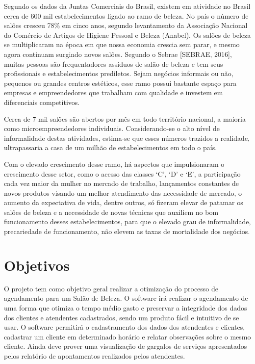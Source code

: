 \documentclass{automatextcc}
\begin{document}
  	Segundo os dados da Juntas Comerciais do Brasil, existem em atividade no Brasil cerca de 600 mil estabelecimentos ligado ao ramo de beleza. No país o número de salões cresceu 78\% em cinco anos, segundo levantamento da Associação Nacional do Comércio de Artigos de Higiene Pessoal e Beleza (Anabel). Os salões de beleza se multiplicaram na época em que nossa economia crescia sem parar, e mesmo agora continuam surgindo novos salões.
  	Segundo o Sebrae [SEBRAE, 2016], muitas pessoas são frequentadores assíduos de salão de beleza e tem seus profissionais e estabelecimentos prediletos. Sejam negócios informais ou não, pequenos ou grandes centros estéticos, esse ramo possui bastante espaço para empresas e empreendedores que trabalham com qualidade e investem em diferenciais competitivos.
  	
 	Cerca de 7 mil salões são abertos por mês em todo território nacional, a maioria como microempreendedores individuais. Considerando-se o alto nível de informalidade destas atividades, estima-se que esses números trazidos a realidade, ultrapassaria a casa de um milhão de estabelecimentos em todo o país.
 	
 	Com o elevado crescimento desse ramo, há aspectos que impulsionaram o crescimento desse setor, como o acesso das classes ‘C’, ‘D’ e ‘E’, a participação cada vez maior da mulher no mercado de trabalho, lançamentos constantes de novos produtos visando um melhor atendimento das necessidade de mercado, o aumento da expectativa de vida, dentre outros, só fizeram elevar de patamar os salões de beleza e a necessidade de novas técnicas que auxiliem no bom funcionamento desses estabelecimentos, para que o elevado grau de informalidade, precariedade de funcionamento, não elevem as taxas de mortalidade dos negócios.


\section{Objetivos}

O projeto tem como objetivo geral realizar a otimização do processo de agendamento para um Salão de Beleza. O software irá realizar o agendamento de uma forma que otimiza o tempo médio gasto e preservar a integridade dos dados dos clientes e atendentes cadastrados, sendo um produto fácil e intuitivo de se usar. O software permitirá o cadastramento dos dados dos atendentes e clientes, cadastrar um cliente em determinado horário e relatar observações sobre o mesmo cliente. Ainda deve prover uma visualização de gargalos de serviços apresentados pelos relatório de apontamentos realizados pelos atendentes.
\end{document}
